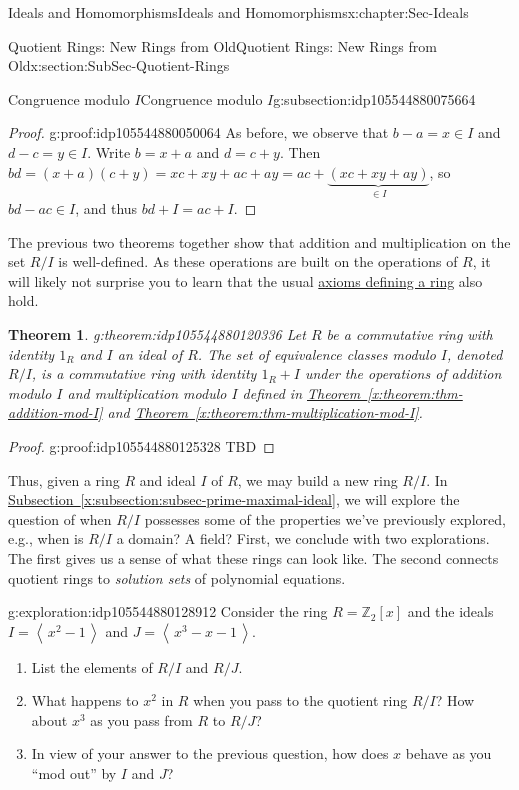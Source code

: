 \documentclass[oneside,10pt,]{book}
\newcommand{\xreffont}{\relax}
\numberwithin{equation}{section}
\newcommand{\ideal}[1]{\left\langle\, #1 \,\right\rangle}
\def\Z{{\mathbb Z}}
\newtheorem{theorem}{Theorem}[section]
\begin{document}
\begin{chapterptx}{Ideals and Homomorphisms}{}{Ideals and Homomorphisms}{}{}{x:chapter:Sec-Ideals}
\begin{sectionptx}{Quotient Rings: New Rings from Old}{}{Quotient Rings: New Rings from Old}{}{}{x:section:SubSec-Quotient-Rings}
\begin{subsectionptx}{Congruence modulo \(I\)}{}{Congruence modulo \(I\)}{}{}{g:subsection:idp105544880075664}
\begin{proof}{}{g:proof:idp105544880050064}
As before, we observe that \(b-a = x\in I\) and \(d-c = y\in I\). Write \(b = x+a\) and \(d = c+y\). Then \(bd = (x+a)(c+y) = xc + xy + ac + ay = ac + \underbrace{(xc+xy+ay)}_{\in I}\), so \(bd - ac \in I\), and thus \(bd + I = ac + I\).%
\end{proof}
The previous two theorems together show that addition and multiplication on the set \(R/I\) is well-defined. As these operations are built on the operations of \(R\), it will likely not surprise you to learn that the usual \hyperref[x:definition:def_ring]{axioms defining a ring} also hold.%
\begin{theorem}{}{}{g:theorem:idp105544880120336}%
%
Let \(R\) be a commutative ring with identity \(1_R\) and \(I\) an ideal of \(R\). The set of equivalence classes modulo \(I\), denoted \(R/I\), is a commutative ring with identity \(1_R + I\) under the operations of addition modulo \(I\) and multiplication modulo \(I\) defined in \hyperref[x:theorem:thm-addition-mod-I]{Theorem~{\xreffont\ref{x:theorem:thm-addition-mod-I}}} and \hyperref[x:theorem:thm-multiplication-mod-I]{Theorem~{\xreffont\ref{x:theorem:thm-multiplication-mod-I}}}.%
\end{theorem}
\begin{proof}{}{g:proof:idp105544880125328}
TBD\end{proof}
Thus, given a ring \(R\) and ideal \(I\) of \(R\), we may build a new ring \(R/I\). In \hyperref[x:subsection:subsec-prime-maximal-ideal]{Subsection~{\xreffont\ref{x:subsection:subsec-prime-maximal-ideal}}}, we will explore the question of when \(R/I\) possesses some of the properties we've previously explored, e.g., when is \(R/I\) a domain? A field? First, we conclude with two explorations. The first gives us a sense of what these rings can look like. The second connects quotient rings to \emph{solution sets} of polynomial equations.%
\begin{exploration}{}{g:exploration:idp105544880128912}%
Consider the ring \(R=\Z_2[x]\) and the ideals \(I = \ideal{x^2-1}\) and \(J = \ideal{x^3 -x -1}\).%
%
\begin{enumerate}
\item{}List the elements of \(R/I\) and \(R/J\).%
\item{}What happens to \(x^2\) in \(R\) when you pass to the quotient ring \(R/I\)? How about \(x^3\) as you pass from \(R\) to \(R/J\)?%
\item{}In view of your answer to the previous question, how does \(x\) behave as you ``mod out'' by \(I\) and \(J\)?%

\end{enumerate}
\end{exploration}
\end{subsectionptx}
\end{sectionptx}
\end{chapterptx}
\end{document}
